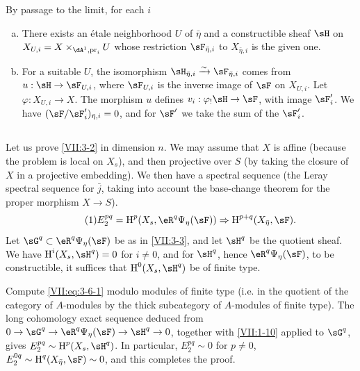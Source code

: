 By passage to the limit, for each $i$
\begin{enumerate}[a)]
  \item There exists an étale neighborhood $U$ of $\bar\eta$ and a
    constructible sheaf $\sH$ on
    $X_{U,i} = X\times_{\dA^1,\pr_i} U$ whose restriction
    $\sF_{\bar\eta,i}$ to $X_{\bar\eta,i}$ is the given one.
  \item For a suitable $U$, the isomorphism
    $\sH_{\bar\eta,i} \iso \sF_{\bar\eta,i}$ comes from
    $u:\sH\to \sF_{U,i}$, where $\sF_{U,i}$ is the inverse image of $\sF$ on
    $X_{U,i}$. Let $\varphi:X_{U,i} \to X$. The morphism $u$ defines
    $v_i:\varphi_! \sH \to \sF$, with image $\sF_i'$. We have
    $(\sF/\sF_i')_{\bar\eta,i} = 0$, and for $\sF'$ we take the sum of the
    $\sF_i'$.
\end{enumerate}






\subsection{}\label{VII:3-6}

Let us prove \ref{VII:3-2} in dimension $n$. We may assume that $X$ is affine
(because the problem is local on $X_s$), and then projective over $S$ (by
taking the closure of $X$ in a projective embedding). We then have a spectral
sequence \cite[I 2.2.3]{sga7} (the Leray spectral sequence for $\bar j$, taking
into account the base-change theorem for the proper morphism $X\to S$).
\begin{equation*}\tag{1}\label{VII:eq:3-6-1}
  E_2^{p q} = \h^p(X_s,\eR^q\Psi_\eta(\sF)) \Rightarrow \h^{p+q}(X_{\bar\eta},\sF) \text{.} 
\end{equation*}
Let $\sG^q\subset \eR^q \Psi_\eta(\sF)$ be as in \ref{VII:3-3}, and let
$\sH^q$ be the quotient sheaf. We have $\h^i(X_s,\sH^q)=0$ for $i\ne 0$, and
for $\sH^q$, hence $\eR^q\Psi_\eta(\sF)$, to be constructible, it suffices
that $\h^0(X_s,\sH^q)$ be of finite type.

Compute \eqref{VII:eq:3-6-1} modulo modules of finite type (i.e. in the
quotient of the category of $A$-modules by the thick subcategory of
$A$-modules of finite type). The long cohomology exact sequence deduced from
$0 \to \sG^q \to \eR^q\Psi_\eta(\sF) \to \sH^q \to 0$, together with
\ref{VII:1-10} applied to $\sG^q$, gives
$E_2^{p q} \sim \h^p(X_s,\sH^q)$. In particular,
$E_2^{p q}\sim 0$ for $p\ne 0$,
$E_2^{0 q}\sim \h^q(X_{\bar\eta},\sF) \sim 0$, and this completes the proof.

